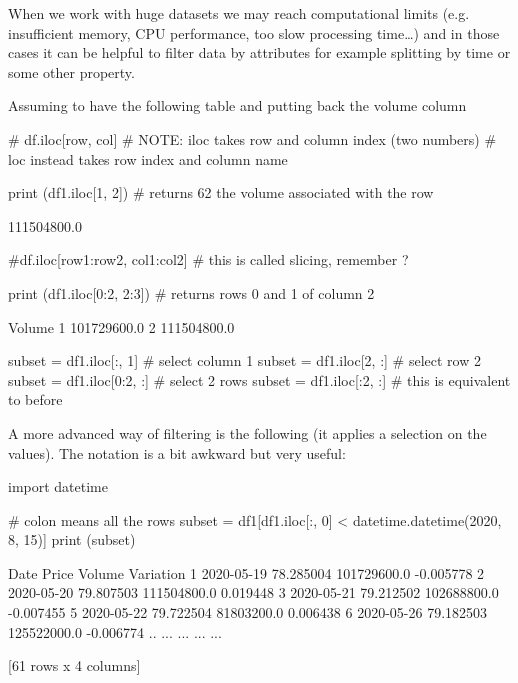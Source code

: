 When we work with huge datasets we may reach computational limits (e.g. insufficient memory, CPU performance, too slow processing time\ldots) and in those cases it can be helpful to filter data by attributes for example splitting by time or some other property.

Assuming to have the following table and putting back the volume column

\begin{ipythonnon}
# df.iloc[row, col]
# NOTE: iloc takes row and column index (two numbers)
# loc instead takes row index and column name

print (df1.iloc[1, 2]) # returns 62 the volume associated with the row
\end{ipythonnon}
\begin{ioutput}
111504800.0
\end{ioutput}

\begin{ipythonnon}
#df.iloc[row1:row2, col1:col2]
# this is called slicing, remember ?

print (df1.iloc[0:2, 2:3]) # returns rows 0 and 1 of column 2
\end{ipythonnon}
\begin{ioutput}
        Volume
1  101729600.0
2  111504800.0
\end{ioutput}

\begin{ipythonnon}
subset = df1.iloc[:, 1] # select column 1
subset = df1.iloc[2, :] # select row 2
subset = df1.iloc[0:2, :] # select 2 rows
subset = df1.iloc[:2, :] # this is equivalent to before
\end{ipythonnon}

A more advanced way of filtering is the following (it applies a selection on the values). The notation is a bit awkward but very useful:

\begin{ipythonnon}
import datetime

# colon means all the rows
subset = df1[df1.iloc[:, 0] < datetime.datetime(2020, 8, 15)]
print (subset)
\end{ipythonnon}
\begin{ioutput}
         Date       Price       Volume  Variation
1  2020-05-19   78.285004  101729600.0  -0.005778
2  2020-05-20   79.807503  111504800.0   0.019448
3  2020-05-21   79.212502  102688800.0  -0.007455
5  2020-05-22   79.722504   81803200.0   0.006438
6  2020-05-26   79.182503  125522000.0  -0.006774
..        ...         ...          ...        ...

[61 rows x 4 columns]
\end{ioutput}

